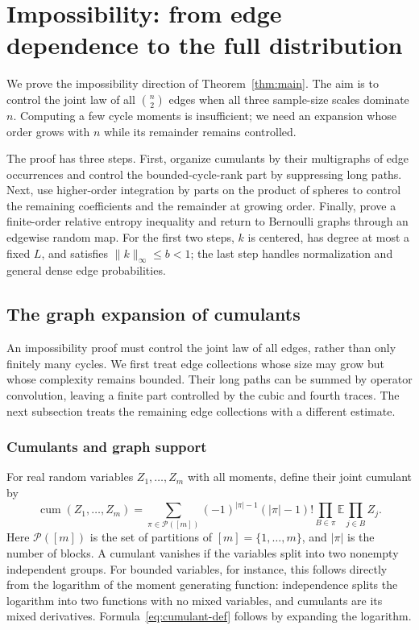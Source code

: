 \documentclass[11pt,reqno]{amsart}
\numberwithin{equation}{section}
\theoremstyle{definition}
\theoremstyle{remark}
\theoremstyle{definition}
\DeclareMathOperator{\cum}{cum}
\begin{document}
\section{Impossibility: from edge dependence to the full distribution}\label{sec:nondetection}
We prove the impossibility direction of Theorem~\ref{thm:main}.
The aim is to control the joint law of all $\binom n2$ edges when all three sample-size scales dominate $n$.
Computing a few cycle moments is insufficient; we need an expansion whose order grows with $n$ while its remainder remains controlled.

The proof has three steps. First, organize cumulants by their multigraphs of edge occurrences
and control the bounded-cycle-rank part by suppressing long paths.
Next, use higher-order integration by parts on the product of spheres to control the remaining coefficients and the remainder at growing order.
Finally, prove a finite-order relative entropy inequality and return to Bernoulli graphs through an edgewise random map.
For the first two steps, $k$ is centered, has degree at most a fixed $L$, and satisfies $\|k\|_\infty\le b<1$;
the last step handles normalization and general dense edge probabilities.
\subsection{The graph expansion of cumulants}\label{sec:cumulants}
An impossibility proof must control the joint law of all edges, rather than only finitely many cycles.
We first treat edge collections whose size may grow but whose complexity remains bounded.
Their long paths can be summed by operator convolution, leaving a finite part controlled by the cubic and fourth traces.
The next subsection treats the remaining edge collections with a different estimate.

\subsubsection{Cumulants and graph support}
For real random variables $Z_1,\ldots,Z_m$ with all moments, define their joint cumulant by
\begin{equation}\label{eq:cumulant-def}
 \cum(Z_1,\ldots,Z_m)
 =\sum_{\pi\in\mathcal P([m])}(-1)^{|\pi|-1}(|\pi|-1)!
      \prod_{B\in\pi}\mathbb E\prod_{j\in B}Z_j.
\end{equation}
Here $\mathcal P([m])$ is the set of partitions of $[m]=\{1,\ldots,m\}$,
and $|\pi|$ is the number of blocks. A cumulant vanishes if the variables split into two nonempty independent groups.
For bounded variables, for instance, this follows directly from the logarithm of the moment generating function:
independence splits the logarithm into two functions with no mixed variables, and cumulants are its mixed derivatives.
Formula~\eqref{eq:cumulant-def} follows by expanding the logarithm.
\end{document}

